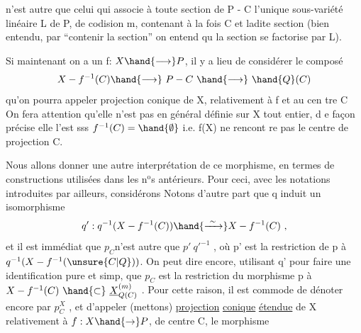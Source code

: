 
n'est autre que celui qui associe à toute section de  P - C  l'unique
sous-variété linéaire  L de P, de codision m, contenant à la fois C
et ladite section  (bien entendu, par ``contenir la section'' on entend qu
la section se factorise par L).

Si maintenant on a un f: $X \hand{\longrightarrow} P$,  il y a lieu de considérer le
composé
\[ X - f^{-1}(C) \hand{\longrightarrow}\ P - C \ \hand{\longrightarrow}\ \hand{Q}(C) \]
qu'on pourra appeler projection conique de X, relativement à f et au cen%
tre C\hand{,}  On fera attention qu'elle n'est pas en général définie sur X tout
entier, d e façon précise elle l'est sss $f^{-1}(C)=\hand{\emptyset}$ i.e. f(X) ne rencont re
pas le centre de projection C. \hand{\unsure{/|)}}

Nous allons donner une autre interprétation de ce morphisme, en
termes de constructions utilisées dans les n$^{\text{o}}$s antérieurs.  Pour ceci,
avec les notations introduites par ailleurs, considérons
Notons d'autre part que  q  induit un  isomorphisme
\[ q':q^{-1}(X-f^{-1}(C)) \hand{\xrightarrow{\ \sim\ }} X - f^{-1}(C) \ , \]
et il est immédiat que  $p_{C}$n'est autre  que   $p'\ q'^{-1}$ , où p' est la
restriction de  p à  $q^{-1}(X-f^{-1}(\unsure{C|Q}))$.  On peut dire encore, utilisant q'
pour faire une identification pure et simp, que  $p_{C}$ est la restriction
du morphisme p  à  $X - f^{-1}(C) \ \hand{\subset}\ \underline{X}^{(m)}_{Q(C)}$ . Pour cette raison, il est
commode de dénoter encore par  $p^{X}_{C}$ , et d'appeler  (mettons)  \uline{projection}
\uline{conique}  \uline{étendue}  de X\hand{,} relativement à $f:X\hand{\rightarrow} P$, de centre C, le morphisme

